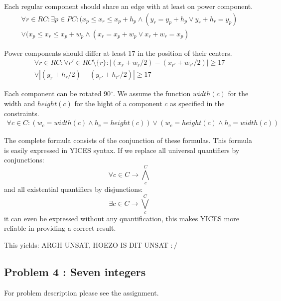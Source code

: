 \documentclass[12pt]{article}
\begin{document}
\vspace{3mm}

Each regular component should share an edge with at least on power component.
\begin{multline}
	\forall r \in RC : \exists p \in PC :
		(x_p \leq x_r \le x_p+h_p \wedge (y_r=y_p+h_p \vee y_r+h_r=y_p)  \\  
		\vee (x_p \leq x_r \le x_p+w_p \wedge (x_r=x_p+w_p \vee x_r+w_r=x_p)
\end{multline}

\vspace{3mm}

Power components should differ at least 17 in the position of their centers.
\begin{multline}
	\forall r \in RC : \forall r' \in RC \setminus \{r\} :
		|(x_r + w_r/2) - (x_{r'} + w_{r'}/2)| \geq 17 \\  
		\vee |(y_r + h_r/2) - (y_{r'} + h_{r'}/2)| \geq 17
\end{multline}

Each component can be rotated 90$^{\circ}$. We assume the function 
$width(c)$ for the width and $height(c)$ for the hight of a component $c$ as
specified in the constraints. 
\begin{multline}
	\forall c \in C : (w_c = width(c) \wedge h_c = height(c))
		\vee (w_c = height(c) \wedge h_c = width(c))
\end{multline}

The complete formula consists of the conjunction of these formulas. This
formula is easily expressed in YICES syntax. If we replace all universal
quantifiers by conjunctions:
\begin{equation}
	\forall c \in C \rightarrow \bigwedge_c^C
\end{equation}
and all existential quantifiers by disjunctions:
\begin{equation}
	\exists c \in C \rightarrow \bigvee_c^C
\end{equation}
it can even be expressed without any quantification, this makes YICES more
reliable in providing a correct result.

This yields: ARGH UNSAT, HOEZO IS DIT UNSAT $:/$


\subsection{Problem 4 : Seven integers}

For problem description please see the assignment.
\end{document}
